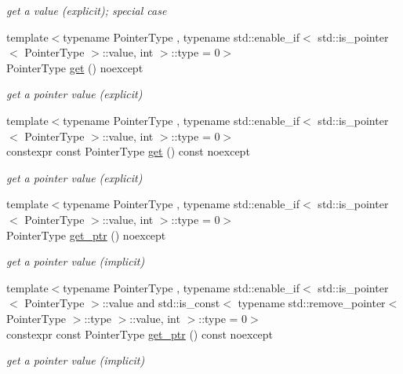 \begin{DoxyCompactItemize}
\begin{DoxyCompactList}\small\item\em get a value (explicit); special case \end{DoxyCompactList}\item 
{\footnotesize template$<$typename Pointer\+Type , typename std\+::enable\+\_\+if$<$ std\+::is\+\_\+pointer$<$ Pointer\+Type $>$\+::value, int $>$\+::type  = 0$>$ }\\Pointer\+Type \hyperlink{classnlohmann_1_1basic__json_a64135c19425f00b346d8ed63a23db334}{get} () noexcept
\begin{DoxyCompactList}\small\item\em get a pointer value (explicit) \end{DoxyCompactList}\item 
{\footnotesize template$<$typename Pointer\+Type , typename std\+::enable\+\_\+if$<$ std\+::is\+\_\+pointer$<$ Pointer\+Type $>$\+::value, int $>$\+::type  = 0$>$ }\\constexpr const Pointer\+Type \hyperlink{classnlohmann_1_1basic__json_a44a090c15a67b9f02e579b6e17ef0e1b}{get} () const noexcept
\begin{DoxyCompactList}\small\item\em get a pointer value (explicit) \end{DoxyCompactList}\item 
{\footnotesize template$<$typename Pointer\+Type , typename std\+::enable\+\_\+if$<$ std\+::is\+\_\+pointer$<$ Pointer\+Type $>$\+::value, int $>$\+::type  = 0$>$ }\\Pointer\+Type \hyperlink{classnlohmann_1_1basic__json_aefa46bd2d96bb77a38d1c8b431eab44f}{get\+\_\+ptr} () noexcept
\begin{DoxyCompactList}\small\item\em get a pointer value (implicit) \end{DoxyCompactList}\item 
{\footnotesize template$<$typename Pointer\+Type , typename std\+::enable\+\_\+if$<$ std\+::is\+\_\+pointer$<$ Pointer\+Type $>$\+::value and std\+::is\+\_\+const$<$ typename std\+::remove\+\_\+pointer$<$ Pointer\+Type $>$\+::type $>$\+::value, int $>$\+::type  = 0$>$ }\\constexpr const Pointer\+Type \hyperlink{classnlohmann_1_1basic__json_a14abd48803a8d5447faf5f583fa8e2a1}{get\+\_\+ptr} () const noexcept
\begin{DoxyCompactList}\small\item\em get a pointer value (implicit) \end{DoxyCompactList}\item 

\end{DoxyCompactItemize}
